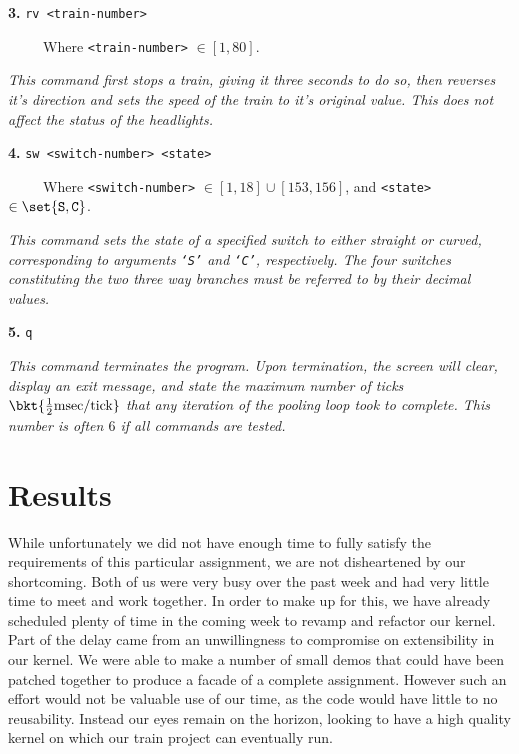 \documentclass{amsart}
\begin{document}
\vspace{0.5cm}
\textbf{3.} \texttt{rv <train-number>}

\ \ \ \ \ Where \texttt{<train-number>} $\in [1,80]$.

\vspace{0.3cm}
\textit{This command first stops a train, giving it three seconds to do so, then reverses it's direction and sets the speed of the train to it's original value. This does not affect the status of the headlights.}

\vspace{0.5cm}
\textbf{4.} \texttt{sw <switch-number> <state>}

\ \ \ \ \ Where \texttt{<switch-number>} $\in [1,18] \cup [153,156]$, and \texttt{<state>} $\in \set{\texttt{S}, \texttt{C}}$.

\vspace{0.3cm}
\textit{This command sets the state of a specified switch to either straight or curved, corresponding to arguments \texttt{`S'} and \texttt{`C'}, respectively. The four switches constituting the two three way branches must be referred to by their decimal values.}

\vspace{0.3cm}
\textbf{5.} \texttt{q}

\vspace{0.3cm}
\textit{This command terminates the program. Upon termination, the screen will clear, display an exit message, and state the maximum number of ticks $\bkt{\frac{1}{2} \text{msec} / \text{tick}}$ that any iteration of the pooling loop took to complete. This number is often $6$ if all commands are tested.}

\section*{Results}

While unfortunately we did not have enough time to fully satisfy the
requirements of this particular assignment, we are not disheartened by our
shortcoming. Both of us were very busy over the past week and had very little
time to meet and work together. In order to make up for this, we have already
scheduled plenty of time in the coming week to revamp and refactor our kernel.
Part of the delay came from an unwillingness to compromise on extensibility in
our kernel. We were able to make a number of small demos that could have been
patched together to produce a facade of a complete assignment. However such an
effort would not be valuable use of our time, as the code would have little to
no reusability. Instead our eyes remain on the horizon, looking to have a high
quality kernel on which our train project can eventually run.
\end{document}
